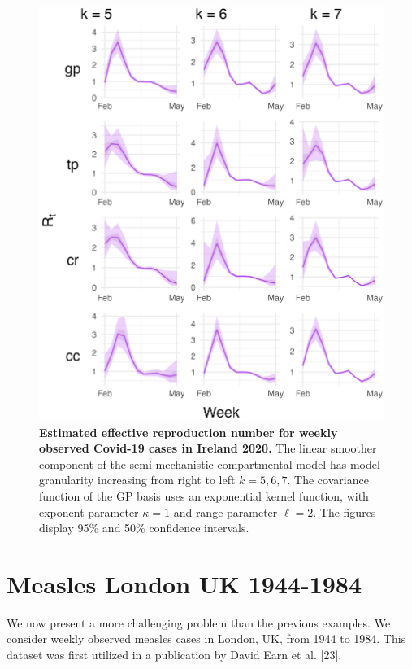 \documentclass[
11pt, %
oneside, %
english, %
singlespacing, %
]{macthesis} %
\begin{document}
\begin{figure}[H]
\centering
\includegraphics[width=\textwidth, height = \textwidth]{figure/Ireland/Ireland_agg_k(5,6,7)_bsd1_beta1_gamma6_sd01_plot_R_t.png}
\caption[Estimated Covid-19 Effective Reproduction Number (2020)]{\textbf{Estimated effective reproduction number for weekly observed Covid-19 cases in Ireland 2020.} The linear smoother component of the semi-mechanistic compartmental model has model granularity increasing from right to left \(k= 5,6,7\). The covariance function of the GP basis uses an exponential kernel function, with exponent parameter \(\kappa = 1\) and range parameter \(\ell = 2\). The figures display 95\% and 50\% confidence intervals.}
\label{fig:ireland_rt}
\end{figure}

\section{Measles London UK 1944-1984}\label{Measles}

We now present a more challenging problem than the previous examples. We consider weekly observed measles cases in London, UK, from 1944 to 1984. This dataset was first utilized in a publication by David Earn et al. {[}23{]}.
\end{document}
